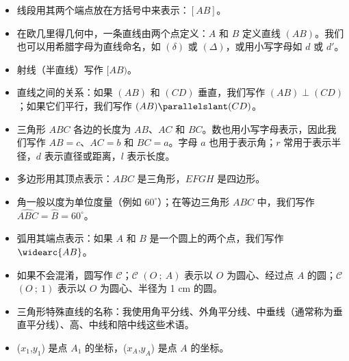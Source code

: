 \begin{itemize}
\begin{tkzexample}[latex=6cm, small]     
\end{tkzexample}

例外：某些点，例如三角形各边的中点，共享一个性质，因此它们的名称也共享一个共同的字母。我们用 $M_a$、$M_b$ 和 $M_c$ 或 $M_A$、$M_B$ 和 $M_C$ 来表示这些点。

在代码中，这些点称为 M\_A、M\_B 和 M\_C。

另一个例外涉及中间作图点，它们不标注。它们在代码中通常用小写字母表示。

\item 线段用其两个端点放在方括号中来表示：$[AB]$。

\item 在欧几里得几何中，一条直线由两个点定义：$A$ 和 $B$ 定义直线 $(AB)$。我们也可以用希腊字母为直线命名，如 $(\delta)$ 或 $(\Delta)$，或用小写字母如 $d$ 或 $d'$。

\item 射线（半直线）写作 $[AB)$。

\item 直线之间的关系：如果 $(AB)$ 和 $(CD)$ 垂直，我们写作 $(AB) \perp (CD)$；如果它们平行，我们写作 $(AB) \parallelslant (CD)$。

\item 三角形 $ABC$ 各边的长度为 $AB$、$AC$ 和 $BC$。数也用小写字母表示，因此我们写作 $AB=c$、$AC=b$ 和 $BC=a$。字母 $a$ 也用于表示角；$r$ 常用于表示半径，$d$ 表示直径或距离，$l$ 表示长度。

\item 多边形用其顶点表示：$ABC$ 是三角形，$EFGH$ 是四边形。

\item 角一般以度为单位度量（例如 $60^\circ$）；在等边三角形 $ABC$ 中，我们写作 $\widehat{ABC}=\widehat{B}=60^\circ$。

\item 弧用其端点表示：如果 $A$ 和 $B$ 是一个圆上的两个点，我们写作 $\widearc{AB}$。

\item 如果不会混淆，圆写作 $\mathcal{C}$；$\mathcal{C}$ $(O~;~A)$ 表示以 $O$ 为圆心、经过点 $A$ 的圆；$\mathcal{C}$ $(O~;~1)$ 表示以 $O$ 为圆心、半径为 1 cm 的圆。

\item 三角形特殊直线的名称：我使用角平分线、外角平分线、中垂线（通常称为垂直平分线）、高、中线和陪中线这些术语。

\item ($x_1$,$y_1$) 是点 $A_1$ 的坐标，($x_A$,$y_A$) 是点 $A$ 的坐标。
\end{itemize}

